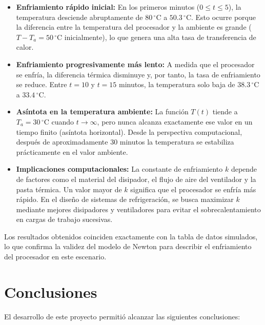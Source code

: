 \documentclass[12pt,a4paper]{article}
\begin{document}
\begin{itemize}
  \item \textbf{Enfriamiento rápido inicial:} En los primeros minutos
        (\(0 \leq t \leq 5\)), la temperatura desciende abruptamente de
        \(80\,{}^\circ\mathrm{C}\) a \(50.3\,{}^\circ\mathrm{C}\). Esto ocurre
        porque la diferencia entre la temperatura del procesador y la ambiente
        es grande (\(T - T_a = 50\,{}^\circ\mathrm{C}\) inicialmente), lo que
        genera una alta tasa de transferencia de calor.

  \item \textbf{Enfriamiento progresivamente más lento:} A medida que el
        procesador se enfría, la diferencia térmica disminuye y, por tanto,
        la tasa de enfriamiento se reduce. Entre \(t=10\) y \(t=15\) minutos,
        la temperatura solo baja de \(38.3\,{}^\circ\mathrm{C}\) a
        \(33.4\,{}^\circ\mathrm{C}\).

  \item \textbf{Asíntota en la temperatura ambiente:} La función \(T(t)\)
        tiende a \(T_a = 30\,{}^\circ\mathrm{C}\) cuando \(t \to \infty\),
        pero nunca alcanza exactamente ese valor en un tiempo finito
        (asíntota horizontal). Desde la perspectiva computacional, después
        de aproximadamente 30 minutos la temperatura se estabiliza
        prácticamente en el valor ambiente.

  \item \textbf{Implicaciones computacionales:} La constante de enfriamiento
        \(k\) depende de factores como el material del disipador, el flujo
        de aire del ventilador y la pasta térmica. Un valor mayor de \(k\)
        significa que el procesador se enfría más rápido. En el diseño de
        sistemas de refrigeración, se busca maximizar \(k\) mediante mejores
        disipadores y ventiladores para evitar el sobrecalentamiento en
        cargas de trabajo sucesivas.
\end{itemize}

Los resultados obtenidos coinciden exactamente con la tabla de datos simulados,
lo que confirma la validez del modelo de Newton para describir el enfriamiento
del procesador en este escenario.

\section{Conclusiones}

El desarrollo de este proyecto permitió alcanzar las siguientes conclusiones:
\end{document}

